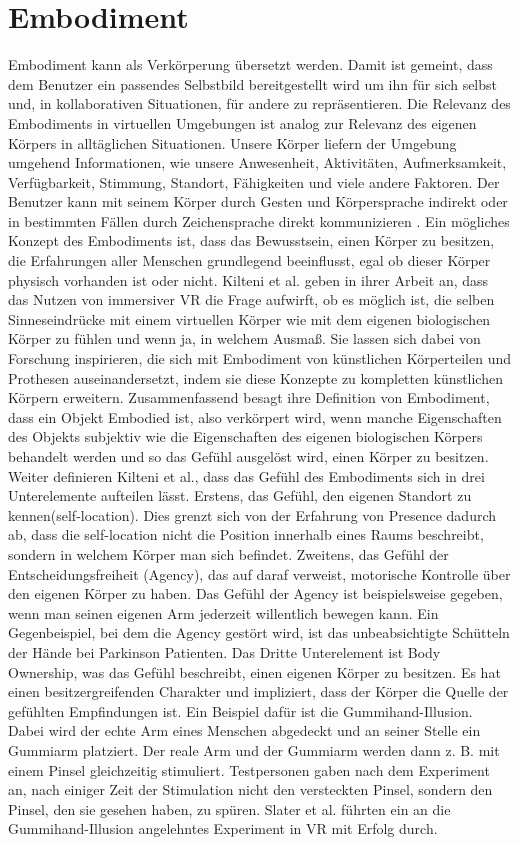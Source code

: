 \section{Embodiment}
Embodiment kann als Verkörperung übersetzt werden. Damit ist gemeint, dass dem Benutzer ein passendes Selbstbild bereitgestellt wird um ihn für sich selbst und, in kollaborativen Situationen, für andere zu repräsentieren. Die Relevanz des Embodiments in virtuellen Umgebungen ist analog zur Relevanz des eigenen Körpers in alltäglichen Situationen. Unsere Körper liefern der Umgebung umgehend Informationen, wie unsere Anwesenheit, Aktivitäten, Aufmerksamkeit, Verfügbarkeit, Stimmung, Standort, Fähigkeiten und viele andere Faktoren. Der Benutzer kann mit seinem Körper durch Gesten und Körpersprache indirekt oder in bestimmten Fällen durch Zeichensprache direkt kommunizieren  \cite{Benford2010}.
Ein mögliches Konzept des Embodiments ist, dass das Bewusstsein, einen Körper zu besitzen, die Erfahrungen aller Menschen grundlegend beeinflusst, egal ob dieser Körper physisch vorhanden ist oder nicht.\cite{Tham2018} Kilteni et al. \cite{Kilteni2012} geben in ihrer Arbeit an, dass das Nutzen von immersiver VR die Frage aufwirft, ob es möglich ist, die selben Sinneseindrücke mit einem virtuellen Körper wie mit dem eigenen biologischen Körper zu fühlen und wenn ja, in welchem Ausmaß. Sie lassen sich  dabei von Forschung inspirieren, die sich mit Embodiment von künstlichen Körperteilen und Prothesen auseinandersetzt, indem sie diese Konzepte zu kompletten künstlichen Körpern erweitern. Zusammenfassend besagt ihre Definition von Embodiment, dass ein Objekt Embodied ist, also verkörpert wird, wenn manche Eigenschaften des Objekts subjektiv wie die Eigenschaften des eigenen biologischen Körpers behandelt werden und so das Gefühl ausgelöst wird, einen Körper zu besitzen.
Weiter definieren Kilteni et al., dass das Gefühl des Embodiments sich in drei Unterelemente aufteilen lässt. Erstens, das Gefühl, den eigenen Standort zu kennen(self-location).  Dies grenzt sich von der Erfahrung von Presence dadurch ab, dass die self-location nicht die Position innerhalb eines Raums beschreibt, sondern in welchem Körper man sich befindet. Zweitens, das Gefühl der Entscheidungsfreiheit (Agency), das auf daraf verweist, motorische Kontrolle über den eigenen Körper zu haben. Das Gefühl der Agency ist beispielsweise gegeben, wenn man seinen eigenen Arm jederzeit willentlich bewegen kann. Ein Gegenbeispiel, bei dem die Agency gestört wird, ist das unbeabsichtigte Schütteln der Hände bei Parkinson Patienten. Das Dritte Unterelement ist Body Ownership, was das Gefühl beschreibt, einen eigenen Körper zu besitzen. Es hat einen besitzergreifenden Charakter und impliziert, dass der Körper die Quelle der gefühlten Empfindungen ist. Ein Beispiel dafür ist die Gummihand-Illusion. Dabei wird der echte Arm eines Menschen abgedeckt und an seiner Stelle ein Gummiarm platziert. Der reale Arm und der Gummiarm werden dann z. B. mit einem Pinsel gleichzeitig stimuliert. Testpersonen gaben nach dem Experiment an, nach einiger Zeit der Stimulation nicht den versteckten Pinsel, sondern den Pinsel, den sie gesehen haben, zu spüren.\cite{Botvinick1998} Slater et al. \cite{Slater2008} führten ein an die Gummihand-Illusion angelehntes Experiment in VR mit Erfolg durch.


